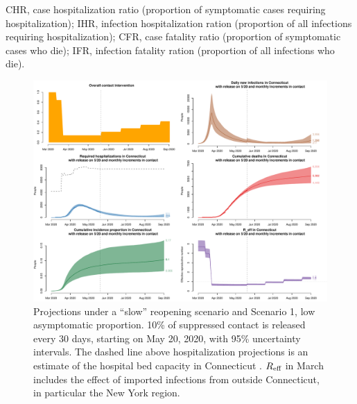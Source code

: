 \documentclass[11pt]{article}
\begin{document}
\begin{table}[!htb]
	{\raggedright CHR, case hospitalization ratio (proportion of symptomatic cases requiring hospitalization); IHR, infection hospitalization ration (proportion of all infections requiring hospitalization);
		          CFR, case fatality ratio (proportion of symptomatic cases who die); IFR, infection fatality ration (proportion of all infections who die). \par}
	\label{tbl:posterior}
\end{table}





\begin{figure} %
	\centering
	\includegraphics[width=.9\textwidth]{figures/slow_low_full.pdf}
	\caption{Projections under a ``slow'' reopening scenario and Scenario 1, low asymptomatic proportion. 10\% of suppressed contact is released every 30 days, starting on May 20, 2020, with 95\% uncertainty intervals. The dashed line above hospitalization projections is an estimate of the hospital bed capacity in Connecticut \citep{CHAwebsite}. $R\textsubscript{eff}$ in March includes the effect of imported infections from outside Connecticut, in particular the New York region.}
	\label{fig:slow_low}
\end{figure}
\end{document}

